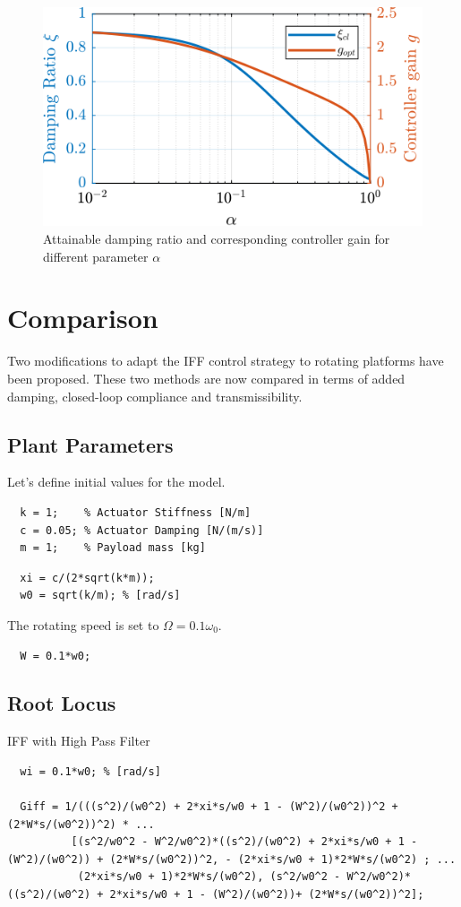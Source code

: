 \documentclass[a4paper, 10pt, DIV=12, parskip=full]{scrreprt}
\begin{document}
\begin{figure}[htbp]
\centering
\includegraphics[scale=1]{figs/opt_damp_alpha.png}
\caption{\label{fig:opt_damp_alpha}Attainable damping ratio and corresponding controller gain for different parameter \(\alpha\)}
\end{figure}

\chapter{Comparison}
\label{sec:org4714bd6}
\label{sec:comparison}
Two modifications to adapt the IFF control strategy to rotating platforms have been proposed.
These two methods are now compared in terms of added damping, closed-loop compliance and transmissibility.

\section{Plant Parameters}
\label{sec:org90a54af}
Let's define initial values for the model.
\begin{verbatim}
  k = 1;    % Actuator Stiffness [N/m]
  c = 0.05; % Actuator Damping [N/(m/s)]
  m = 1;    % Payload mass [kg]
\end{verbatim}

\begin{verbatim}
  xi = c/(2*sqrt(k*m));
  w0 = sqrt(k/m); % [rad/s]
\end{verbatim}

The rotating speed is set to \(\Omega = 0.1 \omega_0\).
\begin{verbatim}
  W = 0.1*w0;
\end{verbatim}

\section{Root Locus}
\label{sec:orgf922463}
IFF with High Pass Filter
\begin{verbatim}
  wi = 0.1*w0; % [rad/s]

  Giff = 1/(((s^2)/(w0^2) + 2*xi*s/w0 + 1 - (W^2)/(w0^2))^2 + (2*W*s/(w0^2))^2) * ...
          [(s^2/w0^2 - W^2/w0^2)*((s^2)/(w0^2) + 2*xi*s/w0 + 1 - (W^2)/(w0^2)) + (2*W*s/(w0^2))^2, - (2*xi*s/w0 + 1)*2*W*s/(w0^2) ; ...
           (2*xi*s/w0 + 1)*2*W*s/(w0^2), (s^2/w0^2 - W^2/w0^2)*((s^2)/(w0^2) + 2*xi*s/w0 + 1 - (W^2)/(w0^2))+ (2*W*s/(w0^2))^2];
\end{verbatim}
\end{document}

